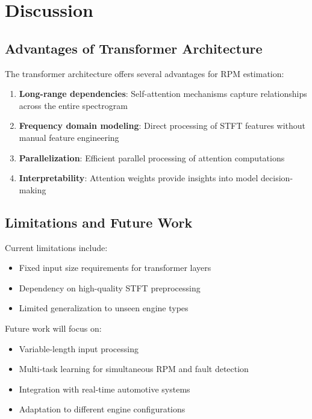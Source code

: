 \documentclass[journal,10pt]{IEEEtran}
\begin{document}
\section{Discussion}

\subsection{Advantages of Transformer Architecture}

The transformer architecture offers several advantages for RPM estimation:

\begin{enumerate}
    \item \textbf{Long-range dependencies}: Self-attention mechanisms capture relationships across the entire spectrogram
    \item \textbf{Frequency domain modeling}: Direct processing of STFT features without manual feature engineering
    \item \textbf{Parallelization}: Efficient parallel processing of attention computations
    \item \textbf{Interpretability}: Attention weights provide insights into model decision-making
\end{enumerate}

\subsection{Limitations and Future Work}

Current limitations include:
\begin{itemize}
    \item Fixed input size requirements for transformer layers
    \item Dependency on high-quality STFT preprocessing
    \item Limited generalization to unseen engine types
\end{itemize}

Future work will focus on:
\begin{itemize}
    \item Variable-length input processing
    \item Multi-task learning for simultaneous RPM and fault detection
    \item Integration with real-time automotive systems
    \item Adaptation to different engine configurations
\end{itemize}
\end{document}
